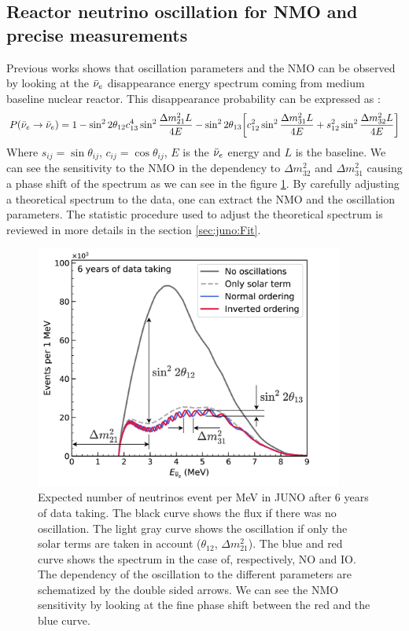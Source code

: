 \subsection{Reactor neutrino oscillation for NMO and precise measurements}
\label{sec:juno:nom_precise_measurement}
Previous works \cite{zhan_determination_2008,  zhan_experimental_2009} shows that oscillation parameters and the NMO can be observed by looking at the $\bar{\nu}_{e}$ disappearance energy spectrum coming from medium baseline nuclear reactor. This disappearance probability can be expressed as \cite{an_neutrino_2016} :
\begin{equation*}
  P(\bar{\nu}_{e} \rightarrow \bar{\nu}_{e}) = 1 - \sin^2 2\theta_{12} c^4_{13} \sin^2 \frac{\Delta m^2_{21}L}{4E} - \sin^2 2\theta_{13} \bigg[ c_{12}^2 \sin^2 \frac{\Delta m_{31}^2 L}{4E} + s^2_{12} \sin^2 \frac{\Delta m_{32}^2 L}{4E} \bigg]
\end{equation*}
Where $s_{ij} = \sin \theta_{ij}$, $c_{ij} = \cos \theta_{ij}$, $E$ is the $\bar{\nu}_{e}$ energy and $L$ is the baseline.
We can see the sensitivity to the NMO in the dependency to $\Delta m_{32}^2$ and $\Delta m^2_{31}$ causing a phase shift of the spectrum as we can see in the figure \ref{fig:juno:juno-spectrum-oscillation}.
By carefully adjusting a theoretical spectrum to the data, one can extract the NMO and the oscillation parameters. The statistic procedure used to adjust the theoretical spectrum is reviewed in more details in the section \ref{sec:juno:Fit}.
\begin{figure}
  \centering
  \includegraphics[height=8cm]{images/juno/Spectrum-OscillationsOnly_dm2_31.png}
  \caption{Expected number of neutrinos event per MeV in JUNO after 6 years of data taking. The black curve shows the flux if there was no oscillation. The light gray curve shows the oscillation if only the solar terms are taken in account ($\theta_{12}$, $\Delta m_{21}^2$). The blue and red curve shows the spectrum in the case of, respectively, NO and IO. The dependency of the oscillation to the different parameters are schematized by the double sided arrows. We can see the NMO sensitivity by looking at the fine phase shift between the red and the blue curve.}
  \label{fig:juno:juno-spectrum-oscillation}
\end{figure}
